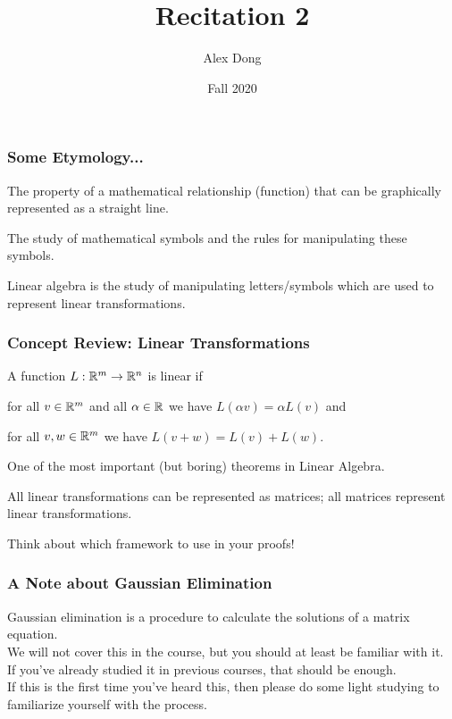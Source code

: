 \documentclass{beamer}
\title{Recitation 2}
\author{Alex Dong}
\institute{CDS, NYU}
\date{Fall 2020}
\newcommand\Fonteight{\fontsize{8}{9.6}\selectfont}
\renewenvironment{enumerate}%
{\begin{list}{\arabic{enumi}.}%
      {\setlength{\leftmargin}{2.5em}%
       \setlength{\itemsep}{-\parsep}%
       \setlength{\topsep}{-\parskip}%
       \usecounter{enumi}}%
 }{\end{list}}
\begin{document}

\frame{\titlepage} 


\begin{frame}
\frametitle{Some Etymology...}

\begin{definition}
The property of a mathematical relationship (function) that can be graphically represented as a straight line.
\end{definition}

\begin{definition}
The study of mathematical symbols and the rules for manipulating these symbols.
\end{definition}
Linear algebra is the study of manipulating letters/symbols which are used to represent linear transformations.
\end{frame}


\begin{frame}
\frametitle{Concept Review: Linear Transformations}

\begin{definition}	        
		A function $L: \mathbb{R}^m \to \mathbb{R}^n$ is linear if
		\Fonteight
		
	\begin{enumerate}
		\item for all $v \in \mathbb{R}^m$ and all $\alpha \in \mathbb{R}$ we have $L(\alpha v) = \alpha L(v)$ and
		\item for all $v,w \in \mathbb{R}^m$ we have $L(v + w) = L(v) + L(w)$.
	\end{enumerate}
\end{definition}

One of the most important (but boring) theorems in Linear Algebra.

\begin{theorem}
All linear transformations can be represented as matrices; all matrices represent linear transformations.
\end{theorem}
Think about which framework to use in your proofs!
\end{frame}


\begin{frame}
\frametitle{A Note about Gaussian Elimination}

Gaussian elimination is a procedure to calculate the solutions of a matrix equation.\\
We will not cover this in the course, but you should at least be familiar with it.\\
If you've already studied it in previous courses, that should be enough.\\
If this is the first time you've heard this, then please do some light studying to familiarize yourself with the process.\\

\end{frame}
\end{document}
